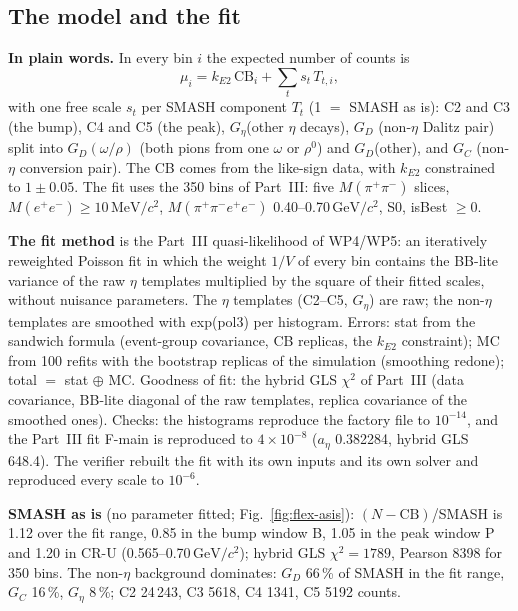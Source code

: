 \documentclass[11pt,a4paper]{article}
\newcommand{\Mfour}{\ensuremath{M(\pi^{+}\pi^{-}e^{+}e^{-})}\xspace}
\newcommand{\Mee}{\ensuremath{M(e^{+}e^{-})}\xspace}
\newcommand{\Mpipi}{\ensuremath{M(\pi^{+}\pi^{-})}\xspace}
\newcommand{\GeVcc}{\ensuremath{\mathrm{GeV}/c^{2}}\xspace}
\newcommand{\MeVcc}{\ensuremath{\mathrm{MeV}/c^{2}}\xspace}
\newcommand{\aEta}{\ensuremath{a_\eta}\xspace}
\newcommand{\kEtwo}{\ensuremath{k_{E2}}\xspace}
\newcommand{\Geta}{\ensuremath{G_\eta}\xspace}
\begin{document}
\subsection{The model and the fit}
\label{sec:flex-model}
\textbf{In plain words.} In every bin $i$ the expected number of counts is
\begin{equation}
\mu_i=\kEtwo\,\mathrm{CB}_i+\sum_t s_t\,T_{t,i},
\label{eq:flex}
\end{equation}
with one free scale $s_t$ per SMASH component $T_t$ (1 $=$ SMASH as is): C2 and C3 (the bump), C4 and C5 (the peak), \Geta (other $\eta$ decays),
$G_D$ (non-$\eta$ Dalitz pair) split into $G_D(\omega/\rho)$ (both pions from one $\omega$ or $\rho^0$) and $G_D$(other), and $G_C$ (non-$\eta$
conversion pair). The CB comes from the like-sign data, with \kEtwo constrained to $1\pm0.05$. The fit uses the 350 bins of Part~III: five
\Mpipi slices, \Mee$\ge10$\,\MeVcc, \Mfour 0.40--0.70\,\GeVcc, S0, isBest $\ge0$.

\textbf{The fit method} is the Part~III quasi-likelihood of WP4/WP5: an iteratively reweighted Poisson fit in which the weight $1/V$ of every bin
contains the BB-lite variance of the raw $\eta$ templates multiplied by the square of their fitted scales, without nuisance parameters. The
$\eta$ templates (C2--C5, \Geta) are raw; the non-$\eta$ templates are smoothed with exp(pol3) per histogram. Errors: stat from the sandwich formula
(event-group covariance, CB replicas, the \kEtwo constraint); MC from 100 refits with the bootstrap replicas of the simulation (smoothing redone);
total $=$ stat $\oplus$ MC. Goodness of fit: the hybrid GLS $\chi^2$ of Part~III (data covariance, BB-lite diagonal of the raw templates, replica
covariance of the smoothed ones). Checks: the histograms reproduce the factory file to $10^{-14}$, and the Part~III fit F-main is reproduced to
$4\times10^{-8}$ (\aEta 0.382284, hybrid GLS 648.4). The verifier rebuilt the fit with its own inputs and its own solver and reproduced every scale
to $10^{-6}$.

\textbf{SMASH as is} (no parameter fitted; Fig.~\ref{fig:flex-asis}): $(N-\mathrm{CB})$/SMASH is 1.12 over the fit range, 0.85 in the bump window B,
1.05 in the peak window P and 1.20 in CR-U (0.565--0.70\,\GeVcc); hybrid GLS $\chi^2=1789$, Pearson 8398 for 350 bins. The non-$\eta$ background
dominates: $G_D$ 66\,\% of SMASH in the fit range, $G_C$ 16\,\%, \Geta 8\,\%; C2 24\,243, C3 5618, C4 1341, C5 5192 counts.
\end{document}
